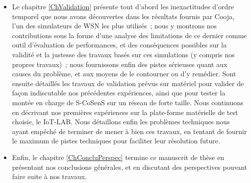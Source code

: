 \begin{itemize}
\item Le chapitre \vref{ChValidation} présente tout d'abord les
inexactitudes d'ordre temporel que nous avons découvertes dans les
résultats fournis par Cooja, l'un des simulateurs de WSN les plus utilisés~;
nous y montrons nos contributions sous la forme d'une analyse des
limitations de ce dernier comme outil d'évaluation de performances, et des
conséquences possibles sur la validité et la justesse des travaux basés
sur ces simulations (y compris nos propres travaux)~; nous fournissons
enfin des pistes sérieuses quant aux causes du problème, et aux moyens
de le contourner ou d'y remédier.
Sont ensuite détaillés les travaux de validation prévus sur matériel
pour valider de façon indiscutable nos précédentes expériences, ainsi
que pour tester la montée en charge de S-CoSenS sur un réseau de forte
taille. Nous continuons en décrivant nos premières expériences sur
la plate-forme matérielle de test choisie, le  IoT-LAB.
Nous détaillons enfin les problèmes techniques nous ayant empêché de
terminer de mener à bien ces travaux, en tentant de fournir le maximum
de pistes techniques pour faciliter leur résolution future.

\item Enfin, le chapitre \vref{ChConcluPerspec} termine ce
manuscrit de thèse en présentant nos conclusions générales, et
en discutant des perspectives pouvant faire suite à nos travaux.

\end{itemize}




